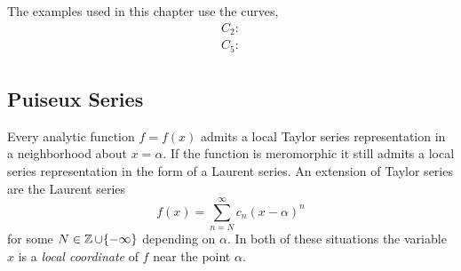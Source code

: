 The examples used in this chapter use the curves,
\begin{align} \label{eq:example-curves}
  C_2:  \\
  C_5:  \\ 
\end{align}


\subsection{Puiseux Series}\label{subsec:background-puiseux-series}

Every analytic function $f = f(x)$ admits a local Taylor series representation
in a neighborhood about $x = \alpha$. If the function is meromorphic it still
admits a local series representation in the form of a Laurent series. An
extension of Taylor series are the Laurent series
\[
    f(x) = \sum_{n=N}^\infty c_n (x-\alpha)^n
\]
for some $N \in \operatorname{\mathbb{Z}} \cup \{-\infty\}$ depending on $\alpha$. In both of these
situations the variable $x$ is a {\it local coordinate} of $f$ near the point
$\alpha$.

